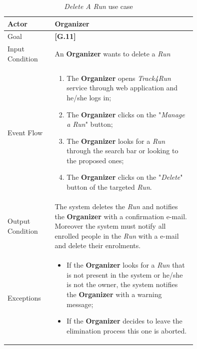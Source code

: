 \begin{center}
\begin{table}[H]
\begin{tabular}{ | l | p{0.75\linewidth} | }
  \hline
    Actor & \textbf{Organizer} \\ \hline
    Goal & \textbf{[G.11]} \\ \hline
    Input Condition & An \textbf{Organizer} wants to delete a \textit{Run} \\ \hline
    Event Flow & \begin{minipage}[t]{0.7\textwidth}
      \begin{enumerate}
        \item The \textbf{Organizer} opens \textit{Track4Run} service through web application and he/she logs in;
        \item The \textbf{Organizer} clicks on the "\textit{Manage a Run}" button;
        \item The \textbf{Organizer} looks for a \textit{Run} through the search bar or looking to the proposed ones;
        \item The \textbf{Organizer} clicks on the "\textit{Delete}" button of the targeted \textit{Run}.
      \end{enumerate}
    \smallskip
  \end{minipage} \\ \hline
  Output Condition & The system deletes the \textit{Run} and notifies the \textbf{Organizer} with a confirmation e-mail. Moreover the system must notify all enrolled people in the \textit{Run} with a e-mail and delete their enrolments. \\ \hline
  Exceptions & \begin{minipage}[t]{0.7\textwidth}
    \begin{itemize}
      \smallskip
      \item If the \textbf{Organizer} looks for a \textit{Run} that is not present in the system or he/she is not the owner, the system notifies the \textbf{Organizer} with a warning message;
      \item If the \textbf{Organizer} decides to leave the elimination process this one is aborted.
    \end{itemize}
    \smallskip
  \end{minipage}  \\ \hline
\end{tabular}
\caption{\textit{Delete A Run} use case}
\label{table:deleteRunTable}
\end{table}
\end{center}

